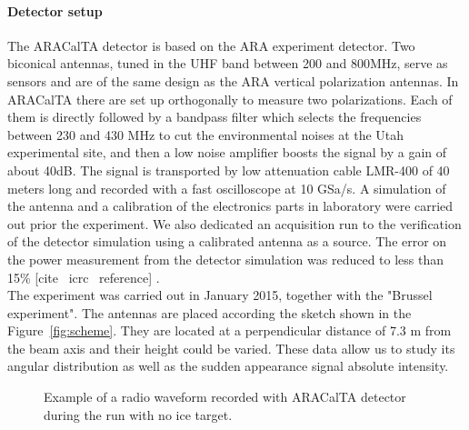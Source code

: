\documentclass[12pt]{article}
\begin{document}
\paragraph{Detector setup}
The ARACalTA detector is based on the ARA experiment detector. Two biconical antennas, tuned in the UHF band between 200 and 800MHz, serve as sensors and are of the same design as the ARA vertical polarization antennas. In ARACalTA there are set up orthogonally to measure two polarizations. Each of them is directly followed by a bandpass filter which selects the frequencies between 230 and  430 MHz to cut the environmental noises at the Utah experimental site, and then a low noise amplifier boosts the signal by a gain of about 40dB.  The signal is transported by low attenuation cable LMR-400 of 40 meters long and recorded with a fast oscilloscope at 10 GSa/s. A simulation of the antenna and a calibration of the electronics parts in laboratory were carried out prior the experiment. We also dedicated an acquisition run to the verification of the detector simulation using a calibrated antenna as a source. The error on the power measurement from the detector simulation was reduced to less than 15\% \color{red} [cite \ icrc \ reference] \color{black}. 
\\ The experiment was carried out in January 2015, together with the "Brussel experiment". The antennas are placed according the sketch shown in the Figure~\ref{fig:scheme}. They are located at a perpendicular distance of 7.3 m from the beam axis and their height could be varied. These data allow us to study its angular distribution as well as the sudden appearance signal absolute intensity.

\begin{figure}[!h]
  \centering
  \hspace*{-3ex}
  \caption{Example of a radio waveform recorded with ARACalTA detector during the run with no ice target.}
  \label{fig:waveform}
\end{figure}
\end{document}
